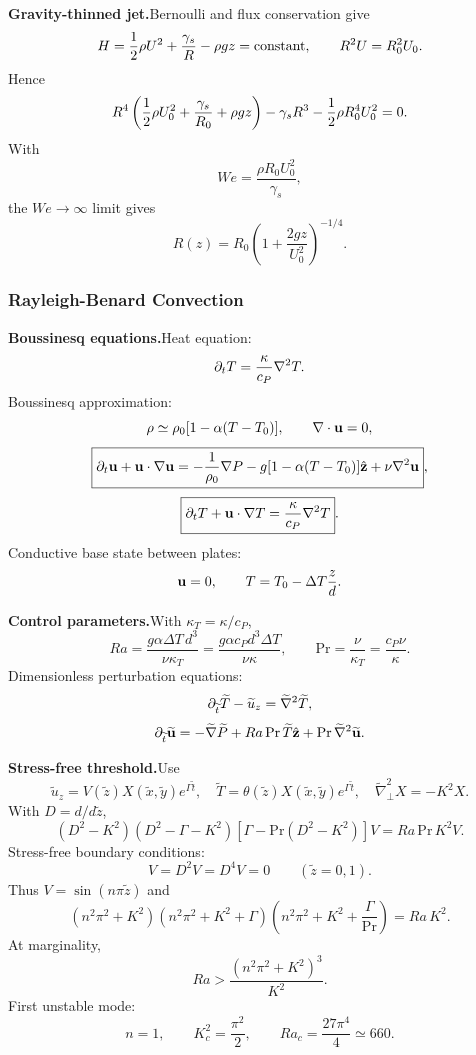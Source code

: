 \noindent\textbf{Gravity-thinned jet.}\quad Bernoulli and flux conservation give
\[
  H=\frac{1}{2}\rho U^2+\frac{\gamma_s}{R}-\rho gz=\text{constant},
  \qquad
  R^2U=R_0^2U_0.
\]
Hence
\[
  R^4\left(\frac{1}{2}\rho U_0^2+\frac{\gamma_s}{R_0}+\rho gz\right)
  -\gamma_s R^3-\frac{1}{2}\rho R_0^4U_0^2=0.
\]
With
\[
  We=\frac{\rho R_0U_0^2}{\gamma_s},
\]
the $We\to\infty$ limit gives
\[
  \boxed{R(z)=R_0\left(1+\frac{2gz}{U_0^2}\right)^{-1/4}}.
\]

\subsubsection*{Rayleigh-Benard Convection}

\noindent\textbf{Boussinesq equations.}\quad Heat equation:
\[
  \partial_tT=\frac{\kappa}{c_P}\nabla^2T.
\]
Boussinesq approximation:
\[
  \rho\simeq\rho_0[1-\alpha(T-T_0)],\qquad \nabla\cdot\mathbf{u}=0,
\]
\[
  \boxed{\partial_t\mathbf{u}+\mathbf{u}\cdot\nabla\mathbf{u}
  =-\frac1{\rho_0}\nabla P-g[1-\alpha(T-T_0)]\hat{\mathbf z}+\nu\nabla^2\mathbf{u}},
\]
\[
  \boxed{\partial_tT+\mathbf{u}\cdot\nabla T=\frac{\kappa}{c_P}\nabla^2T}.
\]
Conductive base state between plates:
\[
  \mathbf{u}=0,\qquad T=T_0-\Delta T\frac{z}{d}.
\]

\noindent\textbf{Control parameters.}\quad With $\kappa_T=\kappa/c_P$,
\[
  \boxed{Ra=\frac{g\alpha\Delta T\,d^3}{\nu\kappa_T}
  =\frac{g\alpha c_Pd^3\Delta T}{\nu\kappa}},
  \qquad
  \boxed{\mathrm{Pr}=\frac{\nu}{\kappa_T}=\frac{c_P\nu}{\kappa}}.
\]
Dimensionless perturbation equations:
\[
  \partial_{\widetilde t}\widetilde T-\widetilde u_z
  =\widetilde\nabla^2\widetilde T,
\]
\[
  \partial_{\widetilde t}\widetilde{\mathbf{u}}
  =-\widetilde\nabla\widetilde P
  +Ra\,\mathrm{Pr}\,\widetilde T\hat{\mathbf z}
  +\mathrm{Pr}\,\widetilde\nabla^2\widetilde{\mathbf{u}}.
\]

\noindent\textbf{Stress-free threshold.}\quad Use
\[
  \widetilde u_z=V(\widetilde z)X(\widetilde x,\widetilde y)e^{\Gamma\widetilde t},
  \quad
  \widetilde T=\theta(\widetilde z)X(\widetilde x,\widetilde y)e^{\Gamma\widetilde t},
  \quad
  \widetilde\nabla_\perp^2X=-K^2X.
\]
With $D=d/d\widetilde z$,
\[
  (D^2-K^2)(D^2-\Gamma-K^2)
  [\Gamma-\mathrm{Pr}(D^2-K^2)]V
  =Ra\,\mathrm{Pr}\,K^2V.
\]
Stress-free boundary conditions:
\[
  V=D^2V=D^4V=0\qquad(\widetilde z=0,1).
\]
Thus $V=\sin(n\pi\widetilde z)$ and
\[
  (n^2\pi^2+K^2)(n^2\pi^2+K^2+\Gamma)
  \left(n^2\pi^2+K^2+\frac{\Gamma}{\mathrm{Pr}}\right)
  =Ra\,K^2.
\]
At marginality,
\[
  Ra>\frac{(n^2\pi^2+K^2)^3}{K^2}.
\]
First unstable mode:
\[
  \boxed{n=1,\qquad K_c^2=\frac{\pi^2}{2},\qquad Ra_c=\frac{27\pi^4}{4}\simeq660}.
\]

